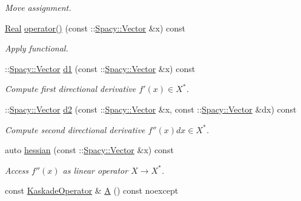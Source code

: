 \begin{DoxyCompactItemize}
\begin{DoxyCompactList}\small\item\em Move assignment. \end{DoxyCompactList}\item 
\hyperlink{classSpacy_1_1Real}{Real} \hyperlink{classSpacy_1_1Kaskade_1_1C2Functional_a74b955be1cc2cb7de4e66b434428fd89}{operator()} (const \+::\hyperlink{classSpacy_1_1Vector}{Spacy\+::\+Vector} \&x) const 
\begin{DoxyCompactList}\small\item\em Apply functional. \end{DoxyCompactList}\item 
\+::\hyperlink{classSpacy_1_1Vector}{Spacy\+::\+Vector} \hyperlink{classSpacy_1_1Kaskade_1_1C2Functional_a69d3260b5313bd495e8f5871b15738db}{d1} (const \+::\hyperlink{classSpacy_1_1Vector}{Spacy\+::\+Vector} \&x) const 
\begin{DoxyCompactList}\small\item\em Compute first directional derivative $f'(x) \in X^* $. \end{DoxyCompactList}\item 
\+::\hyperlink{classSpacy_1_1Vector}{Spacy\+::\+Vector} \hyperlink{classSpacy_1_1Kaskade_1_1C2Functional_a7bd6c110c1f954a92f43f6035787a9f0}{d2} (const \+::\hyperlink{classSpacy_1_1Vector}{Spacy\+::\+Vector} \&x, const \+::\hyperlink{classSpacy_1_1Vector}{Spacy\+::\+Vector} \&dx) const 
\begin{DoxyCompactList}\small\item\em Compute second directional derivative $f''(x)dx\in X^* $. \end{DoxyCompactList}\item 
auto \hyperlink{classSpacy_1_1Kaskade_1_1C2Functional_a73e0b9a2499e89bf85eddf1aa74fe9ba}{hessian} (const \+::\hyperlink{classSpacy_1_1Vector}{Spacy\+::\+Vector} \&x) const 
\begin{DoxyCompactList}\small\item\em Access $f''(x)$ as linear operator $X\rightarrow X^*$. \end{DoxyCompactList}\item 
const \hyperlink{classSpacy_1_1Kaskade_1_1C2Functional_af530f936729e854d2fd1401526149ba1}{Kaskade\+Operator} \& \hyperlink{classSpacy_1_1Kaskade_1_1C2Functional_ab45aa1c81e4698b642a5381a9b6be14b}{A} () const noexcept\hypertarget{classSpacy_1_1Kaskade_1_1C2Functional_ab45aa1c81e4698b642a5381a9b6be14b}{}\label{classSpacy_1_1Kaskade_1_1C2Functional_ab45aa1c81e4698b642a5381a9b6be14b}


\end{DoxyCompactItemize}
